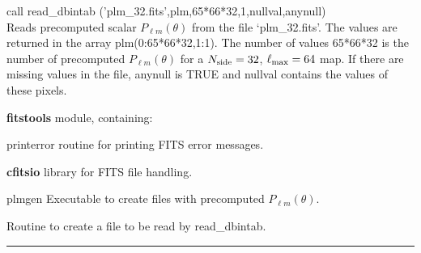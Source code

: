 \begin{example}
{
call read\_dbintab ('plm\_32.fits',plm,65*66*32,1,nullval,anynull)  \\
}
{
Reads precomputed scalar $P_{\ell m}(\theta)$ from the file `plm\_32.fits'. The values are returned in the array plm(0:65*66*32,1:1). The number of values 65*66*32 is the number of precomputed $P_{\ell m}(\theta)$ for a $N_{\mathrm{side}}=32$, $\ell_{\mathrm{max}}=64$ map. If there are missing values in the file, anynull is TRUE and nullval contains the values of these pixels.
}
\end{example}

\begin{modules}
  \begin{sulist}{} %
  \item[\textbf{fitstools}] module, containing:
  \item[printerror] routine for printing FITS error messages.
  \item[\textbf{cfitsio}] library for FITS file handling.		
  \end{sulist}
\end{modules}

\begin{related}
  \begin{sulist}{} %
  \item[plmgen] Executable to create files with precomputed $P_{\ell m}(\theta)$.
  \item[\htmlref{write\_plm}{sub:write_plm}] Routine to create a file to be read by read\_dbintab.
  \end{sulist}
\end{related}

\rule{\hsize}{2mm}

\newpage
